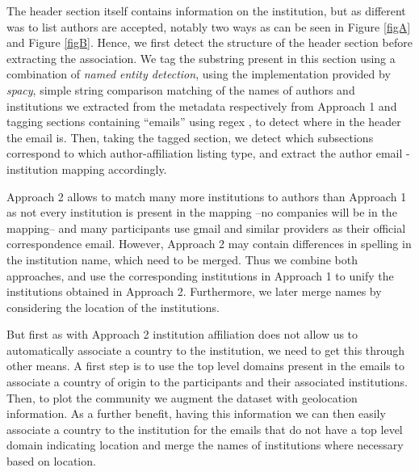 \documentclass[article,twocolumn]{IEEEtran}
\begin{document}
The header section itself contains information on the institution, but
as different was to list authors are accepted, notably two ways as can
be seen in Figure \ref{figA} and Figure \ref{figB}. Hence, we first
detect the structure of the header section before extracting the
association. We tag the substring present in this section using a
combination of \emph{named entity detection}, using the implementation
provided by \emph{spacy}, simple string comparison matching of the names
of authors and institutions we extracted from the metadata respectively
from Approach 1 and tagging sections containing ``emails'' using regex ,
to detect where in the header the email is. Then, taking the tagged
section, we detect which subsections correspond to which
author-affiliation listing type, and extract the author email -
institution mapping accordingly.

Approach 2 allows to match many more institutions to authors than
Approach 1 as not every institution is present in the mapping --no
companies will be in the mapping-- and many participants use gmail and
similar providers as their official correspondence email. However,
Approach 2 may contain differences in spelling in the institution name,
which need to be merged. Thus we combine both approaches, and use the
corresponding institutions in Approach 1 to unify the institutions
obtained in Approach 2. Furthermore, we later merge names by considering
the location of the institutions.

But first as with Approach 2 institution affiliation does not allow us
to automatically associate a country to the institution, we need to get
this through other means. A first step is to use the top level domains
present in the emails to associate a country of origin to the
participants and their associated institutions. Then, to plot the
community we augment the dataset with geolocation information. As a
further benefit, having this information we can then easily associate a
country to the institution for the emails that do not have a top level
domain indicating location and merge the names of institutions where
necessary based on location.
\end{document}
